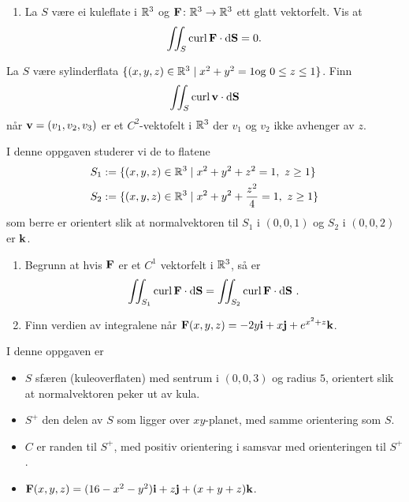 


\oppgave[V2017, Oppgave 5]

\begin{enumerate}
  \item La $S$ være ei kuleflate i $\mathbb{R}^3$ og $\mathbf{F} \colon \mathbb{R}^3 \to \mathbb{R}^3$ ett
    glatt vektorfelt. Vis at
    \begin{equation*}
     \iint_S \operatorname{curl} \mathbf{F} \cdot \mathop{}\! \mathrm{d} \mathbf{S}\mathop{}\! = 0.
    \end{equation*}
\end{enumerate}


\oppgave[V2015, Oppgave 9]

La $S$ være sylinderflata $\{(x,y,z) \in \mathbb{R}^3 \mid x^2 + y^2 = 1 \text{og} \ 0
\leq z \leq 1\}$. Finn
%
\begin{equation*}
  \iint_S \operatorname{curl} \mathbf{v} \cdot \mathop{}\! \mathrm{d} \mathbf{S}\mathop{}\!
\end{equation*}
%
når $\mathbf{v} = (v_1, v_2, v_3)$ er et $C^2$-vektofelt i $\mathbb{R}^3$ der  $v_1$ og
$v_2$ ikke avhenger av $z$.


\oppgave[K2014]

I denne oppgaven studerer vi de to flatene
%
\begin{align*}
  S_1 & := \{ (x,y,z) \in \R^3 \mid x^2 + y^2 + z^2 = 1, \ z \geq 1\} \\
  S_2 & := \{ (x,y,z) \in \R^3 \mid x^2 + y^2 + \frac{z^2}{4} = 1, \ z \geq 1\} 
\end{align*}
%
som berre er orientert slik at normalvektoren til $S_1$ i $(0,0,1)$ og $S_2$ i
$(0,0,2)$ er $\mathbf{k}$.

\begin{enumerate}
  \item Begrunn at hvis $\mathbf{F}$ er et $C^1$ vektorfelt i $\mathbb{R}^3$, så er
    \begin{equation*}
      \iint_{S_1} \operatorname{curl} \mathbf{F} \cdot \mathop{}\! \mathrm{d} \mathbf{S}\mathop{}\! = \iint_{S_2} \operatorname{curl} \mathbf{F} \cdot \mathop{}\! \mathrm{d} \mathbf{S}\mathop{}\!\,.
    \end{equation*}
  \item Finn verdien av integralene når $\mathbf{F}(x,y,z) = -2y \mathbf{i} + x\mathbf{j} + e^{x^2+z}\mathbf{k}$.
\end{enumerate}

\oppgave[V2013, Oppgave 6] I denne oppgaven er

\begin{itemize}
  \item $S$ sfæren (kuleoverflaten) med sentrum i $(0,0,3)$ og radius $5$,
    orientert slik at normalvektoren peker ut av kula.
  \item $S^+$ den delen av $S$ som ligger over $xy$-planet, med samme
    orientering som $S$.
  \item $C$ er randen til $S^+$, med positiv orientering i samsvar med
    orienteringen til $S^+$.
  \item $\mathbf{F}(x,y,z) = (16 - x^2 - y^2)\mathbf{i} + z\mathbf{j} + (x + y + z)\mathbf{k}$.
\end{itemize}

